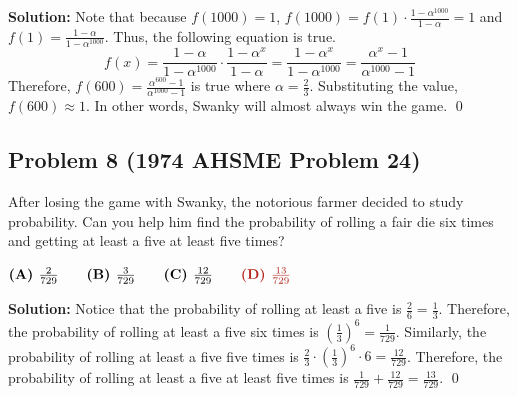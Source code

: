 \documentclass{article}
\newenvironment{solution}
    {\begin{trivlist}\item[]{\bf Solution:}}
    {\qed \end{trivlist}}
\begin{document}
\begin{solution}
Note that because $f(1000) = 1$, $f(1000) =
f(1) \cdot \frac{1 - \alpha^{1000}}{1 - \alpha}
= 1$ and $f(1) = \frac{1 - \alpha}{1 - \alpha^{1000}}$.
Thus, the following equation is true.
\[
f(x)
= \frac{1 - \alpha}{1 - \alpha^{1000}}
    \cdot \frac{1 - \alpha^x}{1 - \alpha}
= \frac{ 1 - \alpha^x }{ 1 - \alpha^{1000} }
= \frac{ \alpha^x - 1 }{ \alpha^{1000} - 1 }
\]
Therefore,
$f(600) = \frac{ \alpha^{600} - 1}{ \alpha^{1000} - 1 }$
is true where $\alpha = \frac{2}{3}$. Substituting the
value, $f(600) \approx 1$. In other words, Swanky will
almost always win the game.
\end{solution}


\subsection*{
\textcolor{BrickRed}{Problem 8
\footnotesize (1974 AHSME Problem 24)}}
{\color {Gray}
After losing the game with Swanky, the notorious
farmer decided to study probability. Can you help
him find the probability of rolling a fair die six
times and getting at least a five at least five times?

$
\textbf{(A) } \frac{2}{729}  \qquad
\textbf{(B) } \frac{3}{729}  \qquad
\textbf{(C) } \frac{12}{729} \qquad
\textcolor{BrickRed}{\textbf{(D) } \frac{13}{729}}
$
}

\begin{solution}
Notice that the probability of rolling at least a
five is $\frac{2}{6} = \frac{1}{3}$. Therefore, the
probability of rolling at least a five six times
is $\left( \frac{1}{3} \right)^6 = \frac{1}{729}$.
Similarly, the probability of rolling at least a five
five times is $\frac{2}{3} \cdot
\left( \frac{1}{3} \right)^6 \cdot 6 = \frac{12}{729}$.
Therefore, the probability of rolling at least a five
at least five times is $\frac{1}{729} + \frac{12}{729}
= \frac{13}{729}$.
\end{solution}
\end{document}
